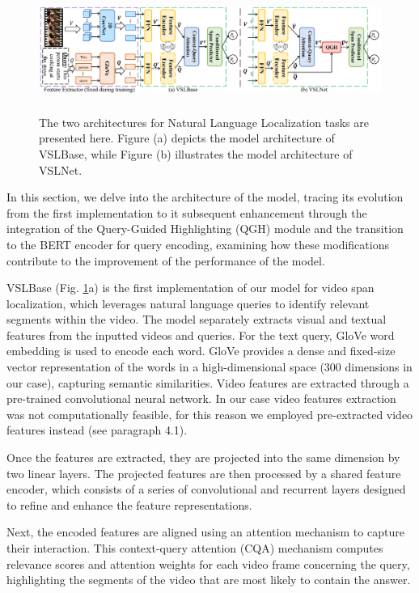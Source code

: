 \documentclass[10pt,twocolumn,letterpaper]{article}
\begin{document}
\begin{figure}
  \includegraphics[width=\textwidth,height=4cm]{VSLnet.png}
  \caption{The two architectures for Natural Language Localization tasks are presented here. Figure (a) depicts the model architecture of VSLBase, while Figure (b) illustrates the model architecture of VSLNet.}
  \label{fig:VSL}
\end{figure}

In this section, we delve into the architecture of the model, tracing its evolution from the first implementation to it subsequent enhancement through the integration of the Query-Guided Highlighting (QGH) module and the transition to the BERT encoder for query encoding, examining how these modifications contribute to the improvement of the performance of the model.

VSLBase (Fig. \ref{fig:VSL}a) is the first implementation of our model for video span localization, which leverages natural language queries to identify relevant segments within the video.  The model separately extracts visual and textual features from the inputted videos and queries. For the text query, GloVe word embedding is used to encode each word. GloVe provides a dense and fixed-size vector representation of the words in a high-dimensional space (300 dimensions in our case), capturing semantic similarities. Video features are extracted through a pre-trained convolutional neural network. In our case video features extraction was not computationally feasible, for this reason we employed pre-extracted video features instead (see paragraph 4.1). 

Once the features are extracted, they are projected into the same dimension by two linear layers. The projected features are then processed by a shared feature encoder, which consists of a series of convolutional and recurrent layers designed to refine and enhance the feature representations.

Next, the encoded features are aligned using an attention mechanism to capture their interaction. This context-query attention (CQA) mechanism computes relevance scores and attention weights for each video frame concerning the query, highlighting the segments of the video that are most likely to contain the answer.
\end{document}
